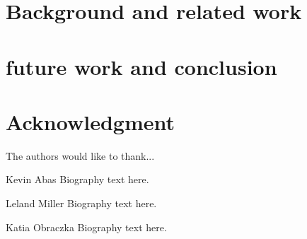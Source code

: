 \documentclass[journal,transmag]{IEEEtran}
\begin{document}
    
    



\section{Background and related work}






\section{future work and conclusion}






\section*{Acknowledgment}


The authors would like to thank...


\ifCLASSOPTIONcaptionsoff
  \newpage
\fi






{}








\begin{IEEEbiographynophoto}{Kevin Abas}
Biography text here.
\end{IEEEbiographynophoto}

\begin{IEEEbiographynophoto}{Leland Miller}
Biography text here.
\end{IEEEbiographynophoto}

\begin{IEEEbiographynophoto}{Katia Obraczka}
Biography text here.
\end{IEEEbiographynophoto}



\end{document}
